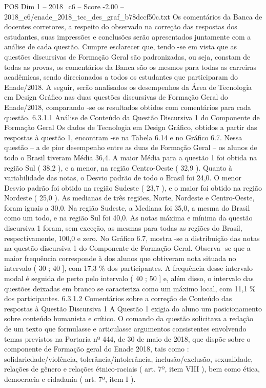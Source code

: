 \begin{textsample}{POS Dim 1 – 2018\_c6 – Score -2.00 – 2018\_c6/enade\_2018\_tec\_des\_graf\_b78dccf50c.txt}
Os comentários da Banca de docentes corretores, a respeito do observado na correção das respostas dos estudantes, suas impressões e conclusões serão apresentados juntamente com a análise de cada questão.
Cumpre esclarecer que, tendo -se em vista que as questões discursivas de Formação Geral são padronizadas, ou seja, constam de todas as provas, os comentários da Banca são os mesmos para todas as carreiras acadêmicas, sendo direcionados a todos os estudantes que participaram do Enade/2018.
A seguir, serão analisados os desempenhos da Área de Tecnologia em Design Gráfico nas duas questões discursivas de Formação Geral do Enade/2018, comparando -se os resultados obtidos com comentários para cada questão. 6.3.1.1 Análise de Conteúdo da Questão Discursiva 1 do Componente de Formação Geral Os dados de Tecnologia em Design Gráfico, obtidos a partir das respostas à questão 1, encontram -se na Tabela 6.14 e no Gráfico 6.7.
Nessa questão – a de pior desempenho entre as duas de Formação Geral – os alunos de todo o Brasil tiveram Média 36,4.
A maior Média para a questão 1 foi obtida na região Sul ( 38,2 ), e a menor, na região Centro-Oeste ( 32,9 ).
Quanto à variabilidade das notas, o Desvio padrão de todo o Brasil foi 24,0.
O menor Desvio padrão foi obtido na região Sudeste ( 23,7 ), e o maior foi obtido na região Nordeste ( 25,0 ).
As medianas de três regiões, Norte, Nordeste e Centro-Oeste, foram iguais a 30,0.
Na região Sudeste, a Mediana foi 35,0, a mesma do Brasil como um todo, e na região Sul foi 40,0.
As notas máxima e mínima da questão discursiva 1 foram, sem exceção, as mesmas para todas as regiões do Brasil, respectivamente, 100,0 e zero.
No Gráfico 6.7, mostra -se a distribuição das notas na questão discursiva 1 do Componente de Formação Geral.
Observa -se que a maior frequência corresponde à dos alunos que obtiveram nota situada no intervalo ( 30 ; 40 ], com 17,3 \% dos participantes.
A frequência desse intervalo modal é seguida de perto pelo intervalo ( 40 ; 50 ] e, além disso, o intervalo das questões deixadas em branco se caracteriza como um máximo local, com 11,1 \% dos participantes. 6.3.1.2 Comentários sobre a correção de Conteúdo das respostas à Questão Discursiva 1 A Questão 1 exigia do aluno um posicionamento sobre conteúdo humanista e crítico.
O comando da questão solicitava a redação de um texto que formulasse e articulasse argumentos consistentes envolvendo temas previstos na Portaria nº 444, de 30 de maio de 2018, que dispõe sobre o componente de Formação geral do Enade 2018, tais como : solidariedade/violência, tolerância/intolerância, inclusão/exclusão, sexualidade, relações de gênero e relações étnico-raciais ( art. 7º, item VIII ), bem como ética, democracia e cidadania ( art. 7º, item I ).

\end{textsample}
